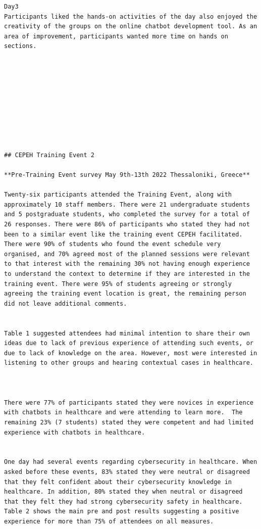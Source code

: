 \documentclass[a4paper, nobind]{templates/ociamthesis}
\begin{document}
\begin{verbatim}
Day3
Participants liked the hands-on activities of the day also enjoyed the creativity of the groups on the online chatbot development tool. As an area of improvement, participants wanted more time on hands on sections.










## CEPEH Training Event 2

**Pre-Training Event survey May 9th-13th 2022 Thessaloniki, Greece**

Twenty-six participants attended the Training Event, along with approximately 10 staff members. There were 21 undergraduate students and 5 postgraduate students, who completed the survey for a total of 26 responses. There were 86% of participants who stated they had not been to a similar event like the training event CEPEH facilitated. There were 90% of students who found the event schedule very organised, and 70% agreed most of the planned sessions were relevant to that interest with the remaining 30% not having enough experience to understand the context to determine if they are interested in the training event. There were 95% of students agreeing or strongly agreeing the training event location is great, the remaining person did not leave additional comments. 


Table 1 suggested attendees had minimal intention to share their own ideas due to lack of previous experience of attending such events, or due to lack of knowledge on the area. However, most were interested in listening to other groups and hearing contextual cases in healthcare.



There were 77% of participants stated they were novices in experience with chatbots in healthcare and were attending to learn more.  The remaining 23% (7 students) stated they were competent and had limited experience with chatbots in healthcare.


One day had several events regarding cybersecurity in healthcare. When asked before these events, 83% stated they were neutral or disagreed that they felt confident about their cybersecurity knowledge in healthcare. In addition, 80% stated they when neutral or disagreed that they felt they had strong cybersecurity safety in healthcare.  Table 2 shows the main pre and post results suggesting a positive experience for more than 75% of attendees on all measures. 




\end{verbatim}
\end{document}

